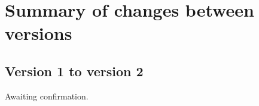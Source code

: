 \section{Summary of changes between versions}
\label{apdx-new}

\subsection{Version 1 to version 2}
\label{apdx-new-one-to-two}

Awaiting confirmation.

